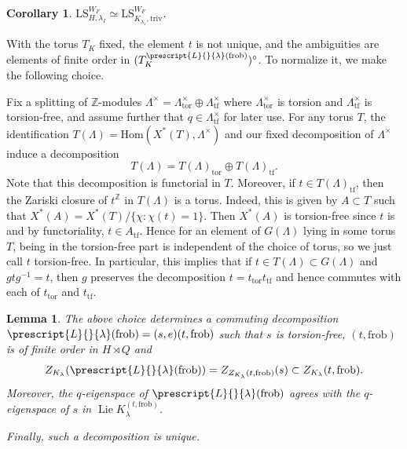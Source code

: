 \documentclass{amsart}
\newtheorem{lemma}[theorem]{Lemma}
\newtheorem{corollary}[theorem]{Corollary}
\theoremstyle{definition}
\theoremstyle{remark}
\numberwithin{equation}{section}
\DeclareMathOperator{\Lie}{Lie}
\newcommand{\Z}{\mathbb{Z}}
\newcommand{\Hom}{\mathrm{Hom}}
\newcommand{\co}[1]{\prescript{#1}{}}
\newcommand{\frob}{\mathrm{frob}}
\newcommand{\triv}{\mathrm{triv}}
\newcommand{\tor}{\mathrm{tor}}
\newcommand{\tf}{\mathrm{tf}}
\newcommand{\LS}{\mathrm{LS}}
\begin{document}
\begin{corollary}
$\LS_{H, \lambda_I}^{W_F} \simeq \LS_{K_{\lambda_1}, \triv}^{W_F}$. 
\end{corollary}

With the torus $T_K$ fixed, the element $t$ is not unique, and the ambiguities are elements of finite order in $(T_K^{\co{L}{\lambda}(\frob)})^\circ$. To normalize it, we make the following choice. 

Fix a splitting of $\Z$-modules $\Lambda^{\times} = \Lambda_{\tor}^{\times} \oplus \Lambda_{\tf}^{\times}$ where $\Lambda_{\tor}^{\times}$ is torsion and $\Lambda_{\tf}^{\times}$ is torsion-free, and assume further that $q \in \Lambda_{\tf}^{\times}$ for later use. For any torus $T$, the identification $T(\Lambda) = \Hom(X^{\ast}(T), \Lambda^{\times})$ and our fixed decomposition of $\Lambda^{\times}$ induce a decomposition 
\begin{equation*}
    T(\Lambda) = T(\Lambda)_{\tor} \oplus T(\Lambda)_{\tf}.
\end{equation*}
Note that this decomposition is functorial in $T$. Moreover, if $t \in T(\Lambda)_{\tf}$, then the Zariski closure of $t^\Z$ in $T(\Lambda)$ is a torus. Indeed, this is given by $A \subset T$ such that $X^{\ast}(A) = X^{\ast}(T) / \{ \chi : \chi(t) = 1\}$. Then $X^{\ast}(A)$ is torsion-free since $t$ is and by functoriality, $t \in A_{\tf}$. Hence for an element of $G(\Lambda)$ lying in some torus $T$, being in the torsion-free part is independent of the choice of torus, so we just call $t$ torsion-free. In particular, this implies that if $t \in T(\Lambda) \subset G(\Lambda)$ and $gtg^{-1}=t$, then $g$ preserves the decomposition $t=t_{\tor}t_{\tf}$ and hence commutes with each of $t_{\tor}$ and $t_{\tf}$.

\begin{lemma}{\label{lem: frobdecomp}}
The above choice determines a commuting decomposition $\co{L}{\lambda}(\frob)=(s,e)(t,\frob)$ such that $s$ is torsion-free, $(t, \frob)$ is of finite order in $H \rtimes Q$ and 
\[
Z_{K_\lambda} (\co{L}{\lambda}(\frob)) = Z_{Z_{K_\lambda} (t, \frob)}(s) \subset Z_{K_\lambda} (t, \frob). 
\]
Moreover, the $q$-eigenspace of $\co{L}{\lambda}(\frob)$ agrees with the $q$-eigenspace of $s$ in $\Lie K_\lambda^{(t,\frob)}$. 

Finally, such a decomposition is unique.
\end{lemma}
\end{document}

